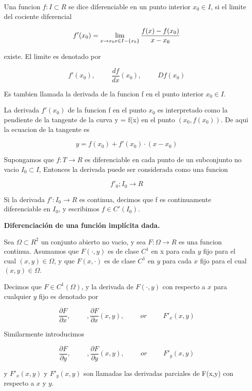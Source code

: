 \documentclass[final,letterpaper,twoside,12pt]{article}
\begin{document}
Una funcion $f: I \subset R$ se dice diferenciable en un punto interior $x_0 \in I$, si el limite del cociente
diferencial

$$
f'(x_0) = \lim_{
x \to x_0 \\
x \in I-\{x_0\}
} \frac{f(x) - f(x_0)}{x - x_0}
$$

existe. El limite es denotado por

$$
f'(x_0), \hspace{1cm} \frac{df}{dx} (x_0), \hspace{1cm} Df(x_0)
$$

Es tambien llamada la derivada de la funcion f en el punto interior $x_0 \in I$.

La derivada $f'(x_0)$ de la funcion f en el punto $x_0$ es interpretado como la pendiente de la tangente de la curva
y = f(x) en el punto $(x_0, f(x_0))$. De aqui la ecuacion de la tangente es

$$
y = f(x_0) + f'(x_0) \cdot (x - x_0)
$$


Supongamos que $f:T \to R$ es diferenciable en cada punto de un subconjunto no vacio $I_{0} \subset I$, Entonces la derivada puede ser considerada como una funcion

$$
f'_0 ; I_0 \to R
$$

Si la derivada $f': I_0 \to R$ es continua, decimos que f es continuamente diferenciable en $I_0$, y escribimos $f \in C'(I_0)$.

\textbf{Diferenciación de una función implícita dada.}

\hfill

Sea $\Omega \subset R^2$ un conjunto abierto no vacio, y sea $F: \Omega \to R$ es una funcion continua. 
Asumamos que $F(\cdot,y)$ es de clase $C^1$ en x para cada $y$ fijo para el cual $(x,y) \in \Omega$, y que $F(x, \cdot)$ es de clase $C^1$ en $y$ para cada $x$ fijo para el cual $(x,y) \in \Omega$.

\hfill

Decimos que $F \in C^1(\Omega)$, y la derivada de $F(\cdot, y)$ con respecto a $x$ para cualquier $y$ fijo
es denotado por

$$
\frac{\partial F}{\partial x}, \hspace{1cm}, \frac{\partial F}{\partial x}(x,y), \hspace{1cm} or \hspace{1cm} 
F'_x (x,y)
$$

Similarmente introducimos

$$
\frac{\partial F}{\partial y}, \hspace{1cm}, \frac{\partial F}{\partial y}(x,y), \hspace{1cm} or \hspace{1cm}
F'_y (x,y)
$$

y $F'_x (x,y)$ y $F'_y (x,y)$ son llamadas las derivadas parciales de F(x,y) con respecto a $x$ y $y$.
\end{document}
